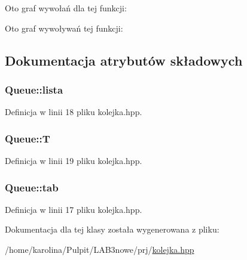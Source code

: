 Oto graf wywołań dla tej funkcji\-:




Oto graf wywoływań tej funkcji\-:




\subsection{Dokumentacja atrybutów składowych}
\hypertarget{class_queue_a4260c29a224d41878c8f9665fbf793eb}{
\subsubsection[{lista}]{ Queue\-::lista\hspace{0.3cm}{\ttfamily [private]}}}\label{class_queue_a4260c29a224d41878c8f9665fbf793eb}


Definicja w linii 18 pliku kolejka.\-hpp.

\hypertarget{class_queue_a7636f4d2ef52ee88df5db9150f4b2b1d}{
\subsubsection[{T}]{ Queue\-::\-T\hspace{0.3cm}{\ttfamily [private]}}}\label{class_queue_a7636f4d2ef52ee88df5db9150f4b2b1d}


Definicja w linii 19 pliku kolejka.\-hpp.

\hypertarget{class_queue_a54458992e4ee244ad98f283f1c553786}{
\subsubsection[{tab}]{ Queue\-::tab\hspace{0.3cm}{\ttfamily [private]}}}\label{class_queue_a54458992e4ee244ad98f283f1c553786}


Definicja w linii 17 pliku kolejka.\-hpp.



Dokumentacja dla tej klasy została wygenerowana z pliku\-:\begin{DoxyCompactItemize}
\item 
/home/karolina/\-Pulpit/\-L\-A\-B3nowe/prj/\hyperlink{kolejka_8hpp}{kolejka.\-hpp}\end{DoxyCompactItemize}
